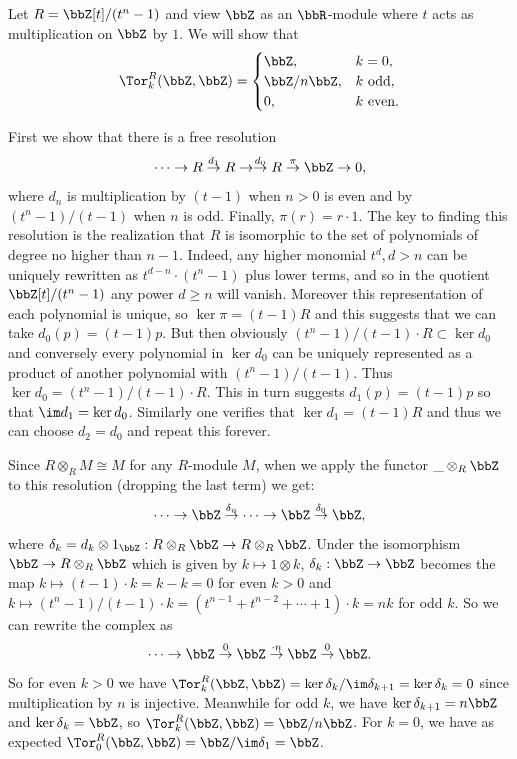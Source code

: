 \begin{example}\label{example Tor with R=Z[t]/(tn-1)}
    Let $R=\bbZ[t]\slash(t^n-1)$ and view $\bbZ$ as an $\bbR$-module where $t$ acts as multiplication on $\bbZ$ by $1$. We will show that
        \[\Tor_k^R(\bbZ,\bbZ)=\begin{cases}
            \bbZ,&k=0,\\
            \bbZ\slash n\bbZ,&k\text{ odd},\\
            0,& k\text{ even}.
        \end{cases}\]

    First we show that there is a free resolution
    \[\cdots\to R\overset{d_1}{\to}R\to \overset{d_0}{\to}R \overset{\pi}{\to}\bbZ\to 0,\]
    where $d_n$ is multiplication by $(t-1)$ when $n>0$ is even and by $(t^n-1)/(t-1)$ when $n$ is odd. Finally, $\pi(r)=r\cdot 1$. The key to finding this resolution is the realization that $R$ is isomorphic to the set of polynomials of degree no higher than $n-1$. Indeed, any higher monomial $t^d, d>n$ can be uniquely rewritten as $t^{d-n}\cdot (t^n-1)$ plus lower terms, and so in the quotient $\bbZ[t]/(t^n-1)$ any power $d\geq n$ will vanish. Moreover this representation of each polynomial is unique, so $\ker\pi =(t-1)R$ and this suggests that we can take $d_0(p)=(t-1)p$. But then obviously $(t^n-1)/(t-1)\cdot R\subset \ker d_0$ and conversely every polynomial in $\ker d_0$ can be uniquely represented as a product of another polynomial with $(t^n-1)/(t-1)$. Thus $\ker d_0=(t^n-1)/(t-1)\cdot R$. This in turn suggests $d_1(p)=(t-1)p$ so that $\im d_1=\ker d_0$. Similarly one verifies that $\ker d_1=(t-1)R$ and thus we can choose $d_2=d_0$ and repeat this forever.

    Since $R\otimes_R M\cong M$ for any $R$-module $M$, when we apply the functor $\_\otimes_R \bbZ$ to this resolution (dropping the last term) we get:
    \[\cdots\to \bbZ \overset{\delta_n}{\to}\cdots \to \bbZ\overset{\delta_0}{\to}\bbZ,\]
    where $\delta_k=d_k\otimes 1_\bbZ: R\otimes_R\bbZ\to R\otimes_R\bbZ$. Under the isomorphism $\bbZ\to R\otimes_R\bbZ$ which is given by $k\mapsto 1\otimes k$, $\delta_k:\bbZ\to \bbZ$  becomes the map $k\mapsto (t-1)\cdot k=k-k=0$ for even $k>0$ and $k\mapsto (t^n-1)/(t-1)\cdot k=(t^{n-1}+t^{n-2}+\cdots +1)\cdot k=nk$ for odd $k$. So we can rewrite the complex as
    \[\cdots\to \bbZ\overset{0}{\to}\bbZ\overset{\cdot n}{\to}\bbZ\overset{0}{\to}\bbZ.\]
    So for even $k>0$ we have $\Tor_k^R(\bbZ,\bbZ)=\ker\delta_k\slash\im\delta_{k+1}=\ker\delta_k=0$ since multiplication by $n$ is injective. Meanwhile for odd $k$, we have $\ker\delta_{k+1}=n\bbZ$ and $\ker \delta_k=\bbZ$, so $\Tor^R_k(\bbZ,\bbZ)=\bbZ\slash n\bbZ$. For $k=0$, we have as expected $\Tor_0^R(\bbZ,\bbZ)=\bbZ\slash \im\delta_1=\bbZ$.
\end{example}


